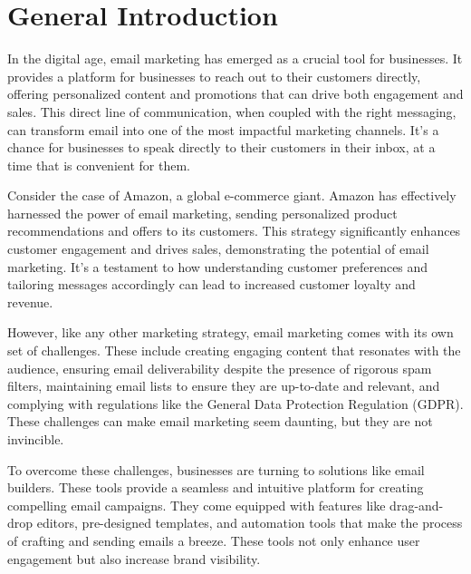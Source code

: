 \chapter*{General Introduction}
\label{Intro}

In the digital age, email marketing has emerged as a crucial tool for businesses. It provides a platform for businesses to reach out to their customers directly, offering personalized content and promotions that can drive both engagement and sales. This direct line of communication, when coupled with the right messaging, can transform email into one of the most impactful marketing channels. It’s a chance for businesses to speak directly to their customers in their inbox, at a time that is convenient for them.

\vspace{10pt}

Consider the case of Amazon, a global e-commerce giant. Amazon has effectively harnessed the power of email marketing, sending personalized product recommendations and offers to its customers. This strategy significantly enhances customer engagement and drives sales, demonstrating the potential of email marketing. It’s a testament to how understanding customer preferences and tailoring messages accordingly can lead to increased customer loyalty and revenue.

\vspace{10pt}

However, like any other marketing strategy, email marketing comes with its own set of challenges. These include creating engaging content that resonates with the audience, ensuring email deliverability despite the presence of rigorous spam filters, maintaining email lists to ensure they are up-to-date and relevant, and complying with regulations like the General Data Protection Regulation (GDPR). These challenges can make email marketing seem daunting, but they are not invincible.

\vspace{10pt}

To overcome these challenges, businesses are turning to solutions like email builders. These tools provide a seamless and intuitive platform for creating compelling email campaigns. They come equipped with features like drag-and-drop editors, pre-designed templates, and automation tools that make the process of crafting and sending emails a breeze. These tools not only enhance user engagement but also increase brand visibility.

